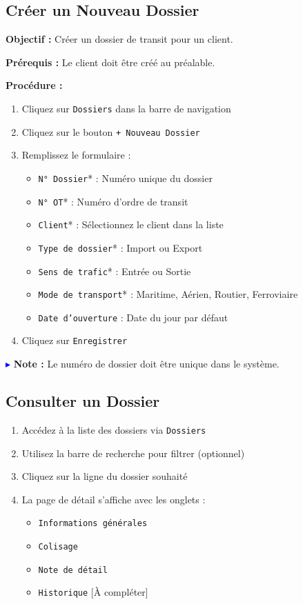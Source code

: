 \documentclass[12pt,a4paper]{report}
\begin{document}
\subsection{Créer un Nouveau Dossier}

\textbf{Objectif :} Créer un dossier de transit pour un client.

\textbf{Prérequis :} Le client doit être créé au préalable.

\textbf{Procédure :}

\begin{enumerate}[leftmargin=*]
    \item Cliquez sur \texttt{Dossiers} dans la barre de navigation
    \item Cliquez sur le bouton \texttt{+ Nouveau Dossier}
    \item Remplissez le formulaire :
    \begin{itemize}
        \item \texttt{N° Dossier}* : Numéro unique du dossier
        \item \texttt{N° OT}* : Numéro d'ordre de transit
        \item \texttt{Client}* : Sélectionnez le client dans la liste
        \item \texttt{Type de dossier}* : Import ou Export
        \item \texttt{Sens de trafic}* : Entrée ou Sortie
        \item \texttt{Mode de transport}* : Maritime, Aérien, Routier, Ferroviaire
        \item \texttt{Date d'ouverture} : Date du jour par défaut
    \end{itemize}
    \item Cliquez sur \texttt{Enregistrer}
\end{enumerate}

\textcolor{blue}{$\blacktriangleright$} \textbf{Note :} Le numéro de dossier doit être unique dans le système.

\subsection{Consulter un Dossier}

\begin{enumerate}[leftmargin=*]
    \item Accédez à la liste des dossiers via \texttt{Dossiers}
    \item Utilisez la barre de recherche pour filtrer (optionnel)
    \item Cliquez sur la ligne du dossier souhaité
    \item La page de détail s'affiche avec les onglets :
    \begin{itemize}
        \item \texttt{Informations générales}
        \item \texttt{Colisage}
        \item \texttt{Note de détail}
        \item \texttt{Historique} [À compléter]
    \end{itemize}
\end{enumerate}
\end{document}
